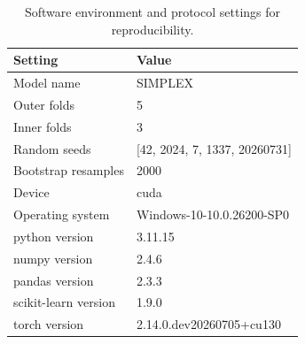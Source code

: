 \begin{table}
\caption{Software environment and protocol settings for reproducibility.}
\label{tab:reproducibility}
\begin{tabular}{ll}
\toprule
Setting & Value \\
\midrule
Model name & SIMPLEX \\
Outer folds & 5 \\
Inner folds & 3 \\
Random seeds & [42, 2024, 7, 1337, 20260731] \\
Bootstrap resamples & 2000 \\
Device & cuda \\
Operating system & Windows-10-10.0.26200-SP0 \\
python version & 3.11.15 \\
numpy version & 2.4.6 \\
pandas version & 2.3.3 \\
scikit-learn version & 1.9.0 \\
torch version & 2.14.0.dev20260705+cu130 \\
\bottomrule
\end{tabular}
\end{table}
